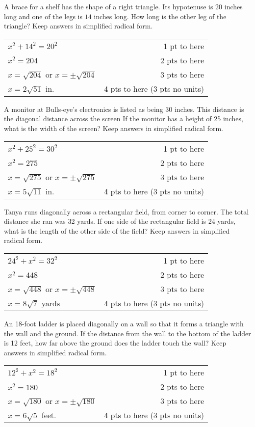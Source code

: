 {
	A brace for a shelf has the shape of a right triangle. Its hypotenuse is $20$ inches long and one of the legs is $14$ inches long. How long is the other leg of the triangle? Keep answers in simplified radical form.
}
{
	\begin{tabular}{l r}
	$x^2+14^2 = 20^2$ & 1 pt to here\\
	$x^2=204$ & 2 pts to here\\
	$x=\sqrt{204}$ or $x=\pm \sqrt{204}$ & 3 pts to here\\
	$x=2\sqrt{51}$ in. & 4 pts to here (3 pts no units)
	\end{tabular}
}

{
	A monitor at Bulls-eye's electronics is listed as being 30 inches.  This distance is the diagonal 
distance across the screen  If the monitor has a height of 25 inches, what is the width of the screen?  Keep answers in simplified radical form.
}
{
	\begin{tabular}{l r}
	$x^2+25^2 = 30^2$ & 1 pt to here\\
	$x^2=275$ & 2 pts to here\\
	$x=\sqrt{275}$ or $x=\pm \sqrt{275}$ & 3 pts to here\\
	$x=5\sqrt{11}$ in. & 4 pts to here (3 pts no units)
	\end{tabular}
}

{
	Tanya runs diagonally across a rectangular field, from corner to corner.  The total distance she ran was 32 yards. If one side of the rectangular field is 24 yards, what is the 
length of the other side of the field?  Keep answers in simplified radical form.
}
{
	\begin{tabular}{l r}
	$24^2+x^2 = 32^2$ & 1 pt to here\\
	$x^2=448$ & 2 pts to here\\
	$x=\sqrt{448}$ or $x=\pm \sqrt{448}$ & 3 pts to here\\
	$x=8\sqrt{7}$ yards & 4 pts to here (3 pts no units)
	\end{tabular}
}

{
	An 18-foot ladder is placed diagonally on a wall so that it forms a triangle with the wall and the ground.  If the distance from the wall to the bottom of the ladder is 12 feet, how far above the  ground does the ladder touch the wall? Keep answers in simplified radical form.
}
{
	\begin{tabular}{l r}
	$12^2+x^2 = 18^2$ & 1 pt to here\\
	$x^2=180$ & 2 pts to here\\
	$x=\sqrt{180}$ or $x=\pm \sqrt{180}$ & 3 pts to here\\
	$x=6\sqrt{5}$ feet. & 4 pts to here (3 pts no units)
	\end{tabular}
}
